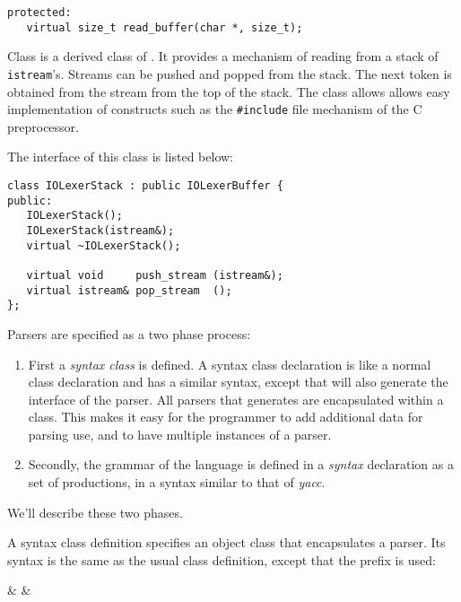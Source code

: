 \begin{verbatim}
protected:
   virtual size_t read_buffer(char *, size_t);
\end{verbatim}


Class 
is a derived class of .  It provides
a mechanism of reading from a stack of \verb|istream|'s.  Streams
can be pushed and popped from the stack.  The next token is 
obtained from the stream from the top of the stack.  The class allows
allows easy implementation of 
constructs such as the \verb|#include| file mechanism of the C preprocessor.

The interface of this class is listed below:
\begin{verbatim}
class IOLexerStack : public IOLexerBuffer {
public:
   IOLexerStack();    
   IOLexerStack(istream&);    
   virtual ~IOLexerStack();
   
   virtual void     push_stream (istream&);
   virtual istream& pop_stream  ();
};
\end{verbatim}


Parsers are specified as a two phase process:
\begin{enumerate}
   \item First a {\em syntax class} is defined.  A syntax class
declaration is like a normal \Cpp{} class declaration and has a similar
syntax, except that \Prop{} will also generate the interface of the parser. 
All parsers that \Prop{} generates are encapsulated within a class.  This
makes it easy for the programmer to add additional data for parsing
use, and to have multiple instances of a parser. 
   \item Secondly, the grammar of the language is defined in a
{\em syntax} declaration as a set of productions, 
in a syntax similar to that of {\em yacc}.
\end{enumerate}

We'll describe these two phases.


A syntax class definition specifies an object class that encapsulates
a parser.  Its syntax is the same as the usual \Cpp{} class definition,
except that the prefix  is used: 

\begin{syntax}
 & \IS &  \Id 
    \T{\{}  \T{\}} \T{;} \\
\end{syntax}


